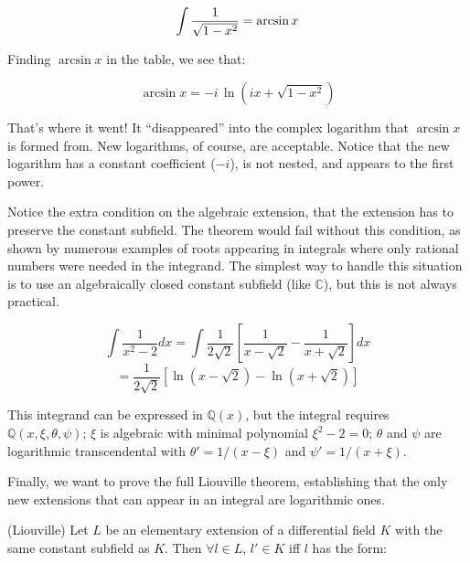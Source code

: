 $$\int{1\over\sqrt{1-x^2}} = \arcsin x$$

Finding $\arcsin x$ in the table, we see that:

$$\arcsin x = -i \,\ln (ix + \sqrt{1-x^2})$$

That's where it went!  It ``disappeared'' into the complex logarithm
that $\arcsin x$ is formed from.  New logarithms, of course, are
acceptable.  Notice that the new logarithm has a constant coefficient
($-i$), is not nested, and appears to the first power.

\endexample

Notice the extra condition on the algebraic extension, that the
extension has to preserve the constant subfield.  The theorem would
fail without this condition, as shown by numerous examples of roots
appearing in integrals where only rational numbers were needed in the
integrand.  The simplest way to handle this situation is to use an
algebraically closed constant subfield (like ${\mathbb C}$), but
this is not always practical.

\example

$$\int \frac{1}{x^2-2} dx = \int \frac{1}{2\sqrt{2}} \left[ \frac{1}{x-\sqrt{2}} - \frac{1}{x+\sqrt{2}} \right] dx$$
$$= \frac{1}{2\sqrt{2}} \left[ \ln(x-\sqrt{2}) - \ln(x+\sqrt{2}) \right]$$

This integrand can be expressed in ${\mathbb Q}(x)$, but the integral
requires ${\mathbb Q}(x,\xi,\theta,\psi)$; $\xi$ is algebraic
with minimal polynomial $\xi^2-2=0$; $\theta$ and $\psi$ are
logarithmic transcendental with $\theta' = 1/(x-\xi)$
and $\psi' = 1/(x+\xi)$.

\endexample

Finally, we want to prove the full Liouville theorem, establishing
that the only new extensions that can appear in an integral are
logarithmic ones.
\begin{comment}
This is a major tool in our program of symbolic
integration, since it severely limits the possible extensions that
need to be searched for an integral.  Indeed, if we could not
limit the appear of new extensions, it is unlikely that we
could completely and systemically evaluate integrals.

The structure theorems above already establish a simplified version of
the Liouville theorem for single extensions.  We need a version of the
Liouville theorem that holds over any number of extensions, so
an induction step is required.
\end{comment}

\theorem\label{weak Liouville theorem} (Liouville)
Let $L$ be an elementary extension of a differential field $K$ with
the same constant subfield as $K$.  Then $\forall l \in L$, $l' \in K$
iff $l$ has the form:

